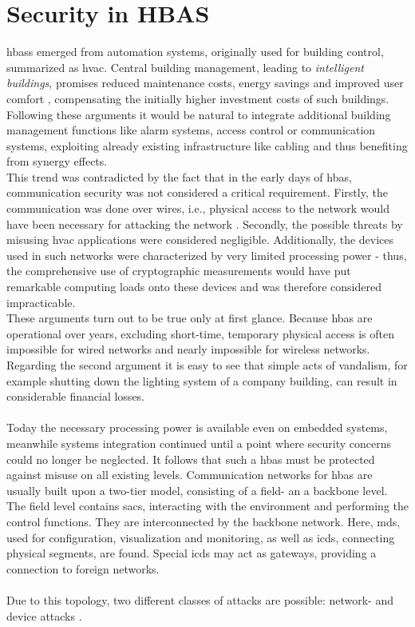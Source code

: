 \section{Security in HBAS}\label{hbaSec}
\glspl{hbas} emerged from automation systems, originally used for building control, summarized as \gls{hvac}.
Central building management, leading to \textit{intelligent buildings}, promises
reduced maintenance costs, energy savings and improved user comfort \cite{1435745}, compensating the initially higher investment costs of such buildings.
Following these arguments it would be natural to integrate additional building management functions like alarm systems, access control or communication systems,
exploiting already existing infrastructure like cabling and thus benefiting from synergy effects.
\\
This trend was contradicted by the fact that in the early days of \gls{hbas}, communication security was not considered a critical requirement.
Firstly, the communication was done over wires,
i.e., physical access to the network would have been necessary for attacking the network \cite{knxSpec}. Secondly, the possible threats by misusing \gls{hvac} applications
were considered negligible. Additionally, the devices used in such networks were characterized by very limited processing power - thus, the comprehensive
use of cryptographic measurements would have put remarkable computing loads onto these devices and was therefore considered impracticable.
\\
These arguments turn out to be true only at first glance. Because \gls{hbas} are operational over years, excluding short-time, temporary physical access is often impossible
for wired networks and nearly impossible for
wireless networks. Regarding the second argument it is easy to see that simple acts of vandalism, for example shutting down the lighting system of a company building, can result
in considerable financial losses.
\\
\\
Today the necessary processing power is available even on embedded systems, meanwhile systems integration continued until a point where security concerns could
no longer be neglected. It follows that such a \gls{hbas} must be protected against misuse on all existing levels. 
Communication networks for \gls{hbas} are usually built upon a two-tier model, consisting of a field- an a backbone level. The field level contains \glspl{sac},
interacting with the environment and performing the control functions. They are interconnected by the backbone network. Here, \glspl{md}, used for configuration,
visualization and monitoring, as well as \glspl{icd}, connecting physical segments, are found. Special \glspl{icd} may act as gateways, providing a connection to foreign networks. 
\\
\\
Due to this topology, two different classes of attacks are possible: network- and device attacks \cite{5332331}.

